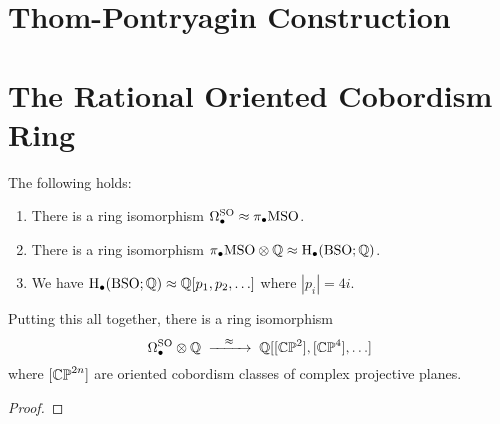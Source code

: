 \section{Thom-Pontryagin Construction}\label{sec:thom-pontryagin_construction}

\section{The Rational Oriented Cobordism Ring}

\begin{theorem}\label{thm:thom-pontryagin_oriented_cobordism}
  The following holds:
  \begin{enumerate}
    \item There is a ring isomorphism $\Omega^{\operatorname{SO}}_\bullet \approx \pi_\bullet {\operatorname{MSO}}$.
    \item There is a ring isomorphism $\pi_\bullet{\operatorname{MSO}} \otimes \mathbb{Q} \approx \operatorname{H}_\bullet({\operatorname{BSO}}; \mathbb{Q})$.
    \item We have $\operatorname{H}_\bullet({\operatorname{BSO}}; \mathbb{Q}) \approx \mathbb{Q}[p_1, p_2,\ldots]$ where $|p_i|=4i$.
  \end{enumerate}
  Putting this all together, there is a ring isomorphism
  \[
    \Omega^\SO_\bullet\otimes \Q \lkxto[\cong] \Q[[\CP^2], [\CP^4],\ldots]
  \]
  where $[\mathbb{CP}^{2n}]$ are oriented cobordism classes of complex projective planes.
\end{theorem}
\begin{proof}
\end{proof}

